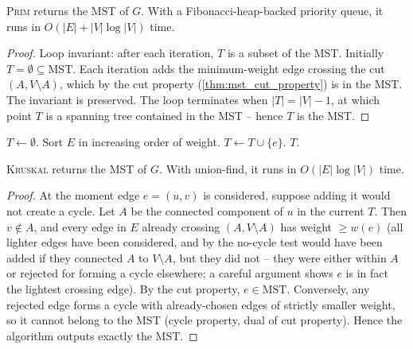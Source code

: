 \begin{theorem}
\label{thm:prim_correctness}
\textsc{Prim} returns the MST of $G$. With a Fibonacci-heap-backed priority queue, it runs in $O(|E| + |V|\log|V|)$ time.
\end{theorem}

\begin{proof}
\sketchproof
Loop invariant: after each iteration, $T$ is a subset of the MST. Initially $T = \emptyset \subseteq \mathrm{MST}$. Each iteration adds the minimum-weight edge crossing the cut $(A, V \setminus A)$, which by the cut property (\cref{thm:mst_cut_property}) is in the MST. The invariant is preserved. The loop terminates when $|T|=|V|-1$, at which point $T$ is a spanning tree contained in the MST -- hence $T$ is the MST.
\end{proof}

\begin{algorithm}[H]
\caption{\textsc{Kruskal}$(G, w)$}
\begin{algorithmic}[1]
\State $T \gets \emptyset$. Sort $E$ in increasing order of weight.
   $T \gets T \cup \{e\}$.
  \EndIf
\EndFor
\State \Return $T$.
\end{algorithmic}
\end{algorithm}

\begin{theorem}
\label{thm:kruskal_correctness}
\textsc{Kruskal} returns the MST of $G$. With union-find, it runs in $O(|E| \log |V|)$ time.
\end{theorem}

\begin{proof}
\sketchproof
At the moment edge $e=(u,v)$ is considered, suppose adding it would not create a cycle. Let $A$ be the connected component of $u$ in the current $T$. Then $v \notin A$, and every edge in $E$ already crossing $(A, V\setminus A)$ has weight $\ge w(e)$ (all lighter edges have been considered, and by the no-cycle test would have been added if they connected $A$ to $V \setminus A$, but they did not -- they were either within $A$ or rejected for forming a cycle elsewhere; a careful argument shows $e$ is in fact the lightest crossing edge). By the cut property, $e \in \mathrm{MST}$. Conversely, any rejected edge forms a cycle with already-chosen edges of strictly smaller weight, so it cannot belong to the MST (cycle property, dual of cut property). Hence the algorithm outputs exactly the MST.
\end{proof}

